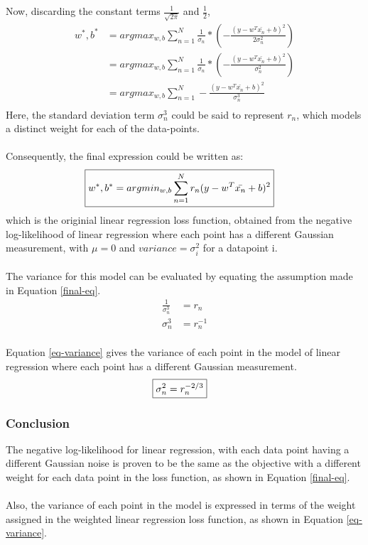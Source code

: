 \documentclass[a4paper]{article}
\begin{document}
Now, discarding the constant terms $\frac{1}{\sqrt{2\pi}}$ and $\frac{1}{2}$,
\\
\begin{align*}
	w^*, b^* &= argmax_{w,b} \sum_{n=1}^{N} \frac{1}{\sigma_n} * (-\frac{(y - w^T\bar{x_n} + b)^2}{2\sigma_n^2})\\
	&= argmax_{w,b} \sum_{n=1}^{N} \frac{1}{\sigma_n} * (-\frac{(y - w^T\bar{x_n} + b)^2}{\sigma_n^2})\\
	&= argmax_{w,b} \sum_{n=1}^{N} -\frac{(y - w^T\bar{x_n} + b)^2}{\sigma_n^3}\\
\end{align*}
Here, the standard deviation term $\sigma_n^3$ could be said to represent $r_n$, which models a distinct weight for each of the data-points.
\\
\\
Consequently, the final expression could be written as:\\
\begin{align}
\label{final-eq}
	\Aboxed{w^*, b^* &= argmin_{w,b} \sum_{n=1}^{N} r_n (y - w^T\bar{x_n} + b)^2}
\end{align}
which is the originial linear regression loss function, obtained from the negative log-likelihood of linear regression where each point has a different Gaussian measurement, with $\mu = 0$ and $variance = \sigma_i^2$ for a datapoint i.
\\
\\
The variance for this model can be evaluated by equating the assumption made in Equation \ref{final-eq}.
\begin{align*}
	\frac{1}{\sigma_n^3} &= r_n\\
	\sigma_n^3 &= r_n^{-1}
\end{align*}
\\
Equation \ref{eq-variance} gives the variance of each point in the model of linear regression where each point has a different Gaussian measurement.
\begin{align}
\label{eq-variance}
	\Aboxed{\sigma_n^2 &= r_n^{-2/3}}
\end{align}


\subsubsection{Conclusion}
The negative log-likelihood for linear regression, with each data point having a different Gaussian noise is proven to be the same as the objective with a different weight for each data point in the loss function, as shown in Equation \ref{final-eq}.\\
\\
Also, the variance of each point in the model is expressed in terms of the weight assigned in the weighted linear regression loss function, as shown in Equation \ref{eq-variance}.
\end{document}
